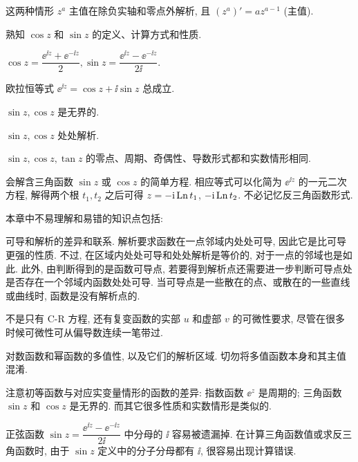 \begin{conclusion}
\begin{conclusion}
    这两种情形 $z^a$ 主值在除负实轴和零点外解析, 且 $(z^a)'=az^{a-1}$ (主值).
  \end{conclusion}
  \item 熟知 $\cos z$ 和 $\sin z$ 的定义、计算方式和性质.
  \smallskip
  \begin{conclusion}
    \item $\cos z=\dfrac{\ee^{\ii z}+\ee^{-\ii z}}2, \sin z=\dfrac{\ee^{\ii z}-\ee^{-\ii z}}{2\ii}$.
    \smallskip
    \item 欧拉恒等式 $\ee^{\ii z}=\cos z+\ii \sin z$ 总成立.
    \item $\sin z,\cos z$ 是无界的.
    \item $\sin z,\cos z$ 处处解析.
    \item $\sin z,\cos z,\tan z$ 的零点、周期、奇偶性、导数形式都和实数情形相同.
  \end{conclusion}
  \item 会解含三角函数 $\sin z$ 或 $\cos z$ 的简单方程. 相应等式可以化简为 $\ee^{\ii z}$ 的一元二次方程, 解得两个根 $t_1,t_2$ 之后可得 $z=-\mathrm{i}\operatorname{Ln} t_1$, $-\mathrm{i}\operatorname{Ln} t_2$. 不必记忆反三角函数形式.
\end{conclusion}

本章中不易理解和易错的知识点包括:
\begin{enuma}
  \item 可导和解析的差异和联系. 解析要求函数在一点邻域内处处可导, 因此它是比可导更强的性质.
  不过, 在区域内处处可导和处处解析是等价的, 对于一点的邻域也是如此.
  此外, 由\thmCR 判断得到的是函数可导点, 若要得到解析点还需要进一步判断可导点处是否存在一个邻域内函数处处可导.
  当可导点是一些散在的点、或散在的一些直线或曲线时, 函数是没有解析点的.
  \item \thmCR 不是只有 C-R 方程, 还有复变函数的实部 $u$ 和虚部 $v$ 的可微性要求, 尽管在很多时候可微性可从偏导数连续一笔带过.
  \item 对数函数和幂函数的多值性, 以及它们的解析区域. 切勿将多值函数本身和其主值混淆.
  \item 注意初等函数与对应实变量情形的函数的差异: 指数函数 $\ee^z$ 是周期的; 三角函数 $\sin z$ 和 $\cos z$ 是无界的. 而其它很多性质和实数情形是类似的.
  \smallskip
  \item 正弦函数 $\sin z=\dfrac{\ee^{\ii z}-\ee^{-\ii z}}{2\ii}$ \smallskip 中分母的 $\ii$ 容易被遗漏掉.
  在计算三角函数值或求反三角函数时, 由于 $\sin z$ 定义中的分子分母都有 $\ii$, 很容易出现计算错误.
\end{enuma}


